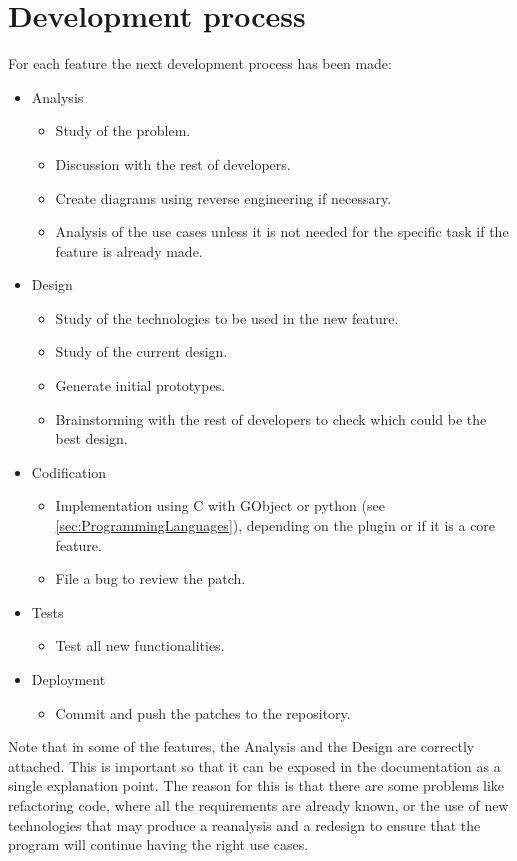 
\chapter{Development process}

For each feature the next development process has been made:

\begin{itemize}
  \item Analysis
    \begin{itemize}
      \item Study of the problem.
      \item Discussion with the rest of developers.
      \item Create diagrams using reverse engineering if necessary.
      \item Analysis of the use cases unless it is not needed for the specific task if the feature is already made.
    \end{itemize}
  \item Design
    \begin{itemize}
      \item Study of the technologies to be used in the new feature.
      \item Study of the current design.
      \item Generate initial prototypes.
      \item Brainstorming with the rest of developers to check which could be the best design.
    \end{itemize}
  \item Codification
    \begin{itemize}
      \item Implementation using C with GObject or python (see \ref{sec:ProgrammingLanguages}), depending on the plugin or if it is a core feature.
      \item File a bug to review the patch.
    \end{itemize}
  \newpage
  \item Tests
    \begin{itemize}
      \item Test all new functionalities.
    \end{itemize}
  \item Deployment
    \begin{itemize}
      \item Commit and push the patches to the \GNOME repository.
    \end{itemize}
\end{itemize}

Note that in some of the features, the Analysis and the Design are correctly attached.   This is important so that it can be exposed in the documentation as a single explanation point.  The reason for this is that there are some problems like refactoring code, where all the requirements are already known, or the use of new technologies that may produce a reanalysis and a redesign to ensure that the program will continue having the right use cases.


